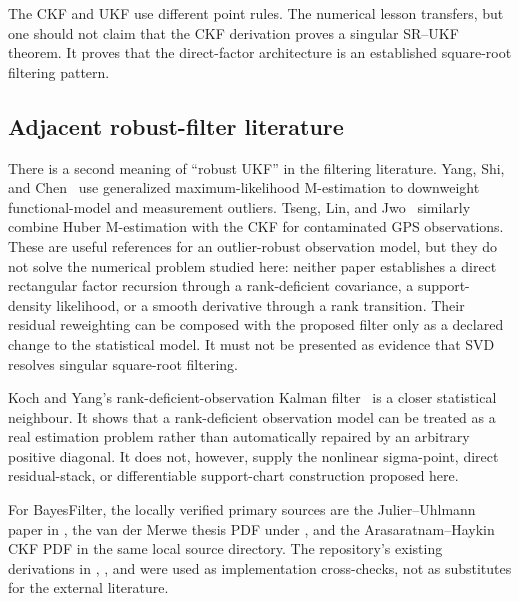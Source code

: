 \documentclass[11pt]{article}
\begin{document}
The CKF and UKF use different point rules.  The numerical lesson transfers, but
one should not claim that the CKF derivation proves a singular SR--UKF theorem.
It proves that the direct-factor architecture is an established square-root
filtering pattern.

\subsection{Adjacent robust-filter literature}

There is a second meaning of ``robust UKF'' in the filtering literature.  Yang,
Shi, and Chen~\cite{yang2019robust} use generalized maximum-likelihood
M-estimation to downweight functional-model and measurement outliers.  Tseng,
Lin, and Jwo~\cite{tseng2017robust} similarly combine Huber M-estimation with
the CKF for contaminated GPS observations.  These are useful references for an
outlier-robust observation model, but they do not solve the numerical problem
studied here: neither paper establishes a direct rectangular factor recursion
through a rank-deficient covariance, a support-density likelihood, or a smooth
derivative through a rank transition.  Their residual reweighting can be
composed with the proposed filter only as a declared change to the statistical
model.  It must not be presented as evidence that SVD resolves singular
square-root filtering.

Koch and Yang's rank-deficient-observation Kalman filter~\cite{kochyang1998}
is a closer statistical neighbour.  It shows that a rank-deficient observation
model can be treated as a real estimation problem rather than automatically
repaired by an arbitrary positive diagonal.  It does not, however, supply the
nonlinear sigma-point, direct residual-stack, or differentiable support-chart
construction proposed here.

For BayesFilter, the locally verified primary sources are the Julier--Uhlmann
paper in , the van der Merwe
thesis PDF under , and the Arasaratnam--Haykin CKF PDF in the same
local source directory.  The repository's existing derivations in
,
, and  were
used as implementation cross-checks, not as substitutes for the external
literature.
\end{document}
